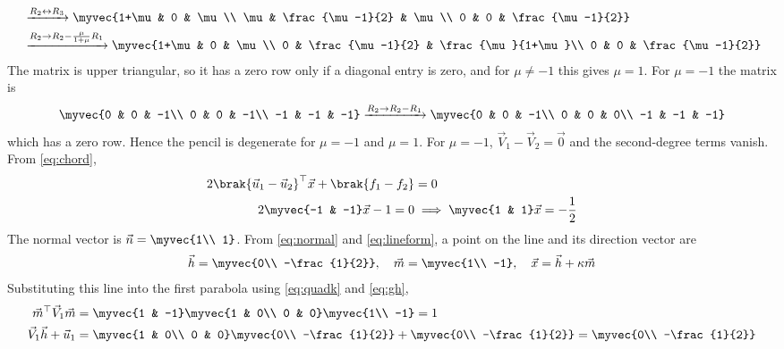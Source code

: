\begin{enumerate}[label=\thesubsection.\arabic*, ref=\thesubsection.\theenumi, itemsep=0pt, leftmargin=*]
\begin{align}
&\xrightarrow{R_2\leftrightarrow R_3}
\myvec{1+\mu & 0 & \mu\\ \mu & \frac{\mu-1}{2} & \mu\\ 0 & 0 & \frac{\mu-1}{2}}\\
&\xrightarrow{R_2\to R_2 - \frac{\mu}{1+\mu}R_1}
\myvec{1+\mu & 0 & \mu\\ 0 & \frac{\mu-1}{2} & \frac{\mu}{1+\mu}\\ 0 & 0 & \frac{\mu-1}{2}}
\end{align}
The matrix is upper triangular, so it has a zero row only if a diagonal entry is zero, and for $\mu \ne -1$ this gives $\mu = 1$. For $\mu = -1$ the matrix is
\begin{align}
\myvec{0 & 0 & -1\\ 0 & 0 & -1\\ -1 & -1 & -1} \xrightarrow{R_2\to R_2 - R_1} \myvec{0 & 0 & -1\\ 0 & 0 & 0\\ -1 & -1 & -1}
\end{align}
which has a zero row. Hence the pencil is degenerate for $\mu = -1$ and $\mu = 1$.
For $\mu = -1$, $\vec{V}_1 - \vec{V}_2 = \vec{0}$ and the second-degree terms vanish. From \eqref{eq:chord},
\begin{align}
2\brak{\vec{u}_1 - \vec{u}_2}^\top\vec{x} + \brak{f_1 - f_2} &= 0\\
2\myvec{-1 & -1}\vec{x} - 1 = 0 &\implies \myvec{1 & 1}\vec{x} = -\frac{1}{2}
\end{align}
The normal vector is $\vec{n} = \myvec{1\\ 1}$. From \eqref{eq:normal} and \eqref{eq:lineform}, a point on the line and its direction vector are
\begin{align}
\vec{h} = \myvec{0\\ -\frac{1}{2}},\quad \vec{m} = \myvec{1\\ -1},\quad \vec{x} = \vec{h} + \kappa\vec{m}
\end{align}
Substituting this line into the first parabola using \eqref{eq:quadk} and \eqref{eq:gh},
\begin{align}
\vec{m}^\top\vec{V}_1\vec{m} &= \myvec{1 & -1}\myvec{1 & 0\\ 0 & 0}\myvec{1\\ -1} = 1\\
\vec{V}_1\vec{h} + \vec{u}_1 &= \myvec{1 & 0\\ 0 & 0}\myvec{0\\ -\frac{1}{2}} + \myvec{0\\ -\frac{1}{2}} = \myvec{0\\ -\frac{1}{2}}\\

\end{align}
\end{enumerate}
